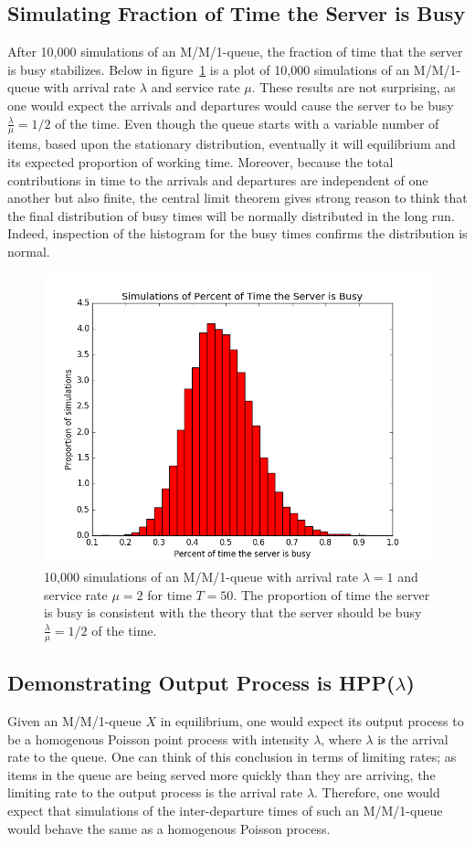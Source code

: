 \documentclass[11pt, oneside]{article}
\begin{document}
\subsection{Simulating Fraction of Time the Server is Busy}
After 10,000 simulations of an M/M/1-queue, the fraction of time that the server is busy stabilizes. Below in figure~\ref{fig:busy} is a plot of 10,000 simulations of an M/M/1-queue with arrival rate $\lambda$ and service rate $\mu$. These results are not surprising, as  one would expect the arrivals and departures would cause the server to be busy $\frac{\lambda}{\mu}=1/2$ of the time. Even though the queue starts with a variable number of items, based upon the stationary distribution, eventually it will equilibrium and its expected proportion of working time. Moreover, because the total contributions in time to the arrivals and departures are independent of one another but also finite, the central limit theorem gives strong reason to think that the final distribution of busy times will be normally distributed in the long run. Indeed, inspection of the histogram for the busy times confirms the distribution is normal.
\begin{figure}[H]
\includegraphics[scale=0.6]{busy_server}
\caption{10,000 simulations of an M/M/1-queue with arrival rate $\lambda=1$ and service rate $\mu=2$ for time $T=50$. The proportion of time the server is busy is consistent with the theory that the server should be busy $\frac{\lambda}{\mu}=1/2$ of the time.}
\label{fig:busy}
\end{figure}

\subsection{Demonstrating Output Process is HPP($\lambda$)}
Given an M/M/1-queue $X$ in equilibrium, one would expect its output process to be a homogenous Poisson point process with intensity $\lambda$, where $\lambda$ is the arrival rate to the queue. One can think of this conclusion in terms of limiting rates; as items in the queue are being served more quickly than they are arriving, the limiting rate to the output process is the arrival rate $\lambda$. Therefore, one would expect that simulations of the inter-departure times of such an M/M/1-queue would behave the same as a homogenous Poisson process. 
\end{document}
